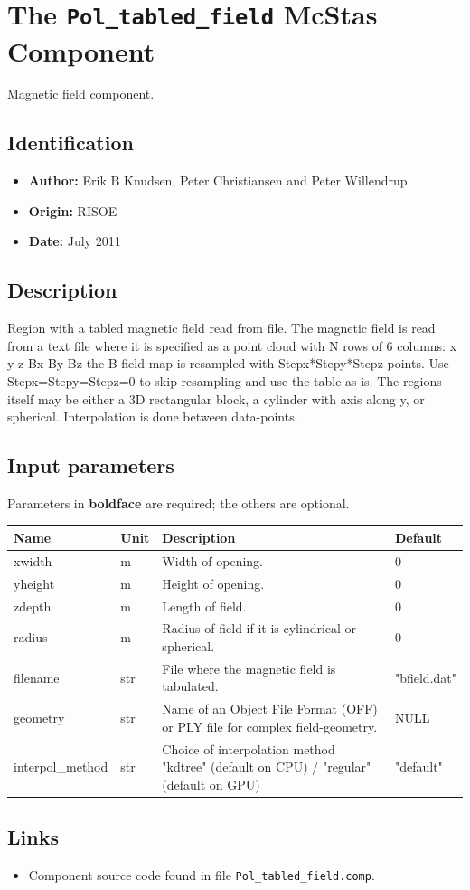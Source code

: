 \section{The \texttt{Pol\_tabled\_field} McStas Component}
Magnetic field component.

\subsection*{Identification}
\begin{itemize}
  \item \textbf{Author:} Erik B Knudsen, Peter Christiansen and Peter Willendrup
  \item \textbf{Origin:} RISOE
  \item \textbf{Date:} July 2011
\end{itemize}

\subsection*{Description}
Region with a tabled magnetic field read from file. The magnetic field is read from a text file where it is specified as a point cloud with N rows of 6 columns: x y z Bx By Bz the B field map is resampled with Stepx*Stepy*Stepz points. Use Stepx=Stepy=Stepz=0 to skip resampling and use the table as is. The regions itself may be either a 3D rectangular block, a cylinder with axis along y, or spherical. Interpolation is done between data-points.

\subsection*{Input parameters}
Parameters in \textbf{boldface} are required; the others are optional.

\begin{longtable}{p{}p{}p{}p{}}
\toprule
\textbf{Name} & \textbf{Unit} & \textbf{Description} & \textbf{Default} \\
\midrule
\endhead
xwidth & m & Width of opening. & 0 \\
yheight & m & Height of opening. & 0 \\
zdepth & m & Length of field. & 0 \\
radius & m & Radius of field if it is cylindrical or spherical. & 0 \\
filename & str & File where the magnetic field is tabulated. & "bfield.dat" \\
geometry & str & Name of an Object File Format (OFF) or PLY file for complex field-geometry. & NULL \\
interpol\_method & str & Choice of interpolation method "kdtree" (default on CPU) / "regular" (default on GPU) & "default" \\
\bottomrule
\end{longtable}

\subsection*{Links}
\begin{itemize}
  \item Component source code found in file \texttt{Pol\_tabled\_field.comp}.
\end{itemize}
